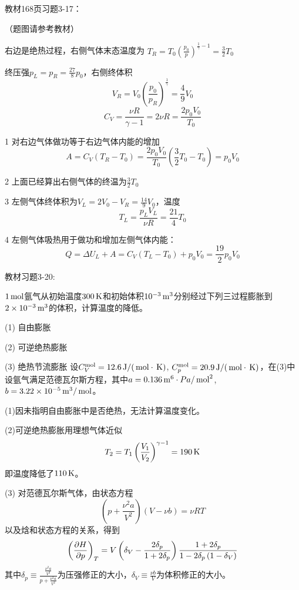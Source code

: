 \documentclass[CJK]{beamer}
\begin{document}
\begin{frame}
  \chtitle{\proid (\stwo)}
  \bch
  教材168页习题3-17：

  （题图请参考教材）
  \ech
\end{frame}

\begin{frame}
  \bch
  {\scriptsize
    右边是绝热过程，右侧气体末态温度为
    $T_R = T_0\left(\frac{p_0}{p}\right)^{\frac{1}{\gamma}-1} = \frac{3}{2}T_0$
    
    终压强$p_L=p_R=\frac{27}{8}p_0$，右侧终体积
    $$V_R = V_0\left(\frac{p_0}{p_R}\right)^{\frac{1}{\gamma}} = \frac{4}{9}V_0$$
    $$C_V = \frac{\nu R}{\gamma - 1} = 2 \nu R = \frac{2p_0V_0}{T_0}$$
  
    \bitem
  \item[1]{对右边气体做功等于右边气体内能的增加
    $$A = C_V(T_R-T_0) = \frac{2p_0V_0}{T_0}\left(\frac{3}{2}T_0-T_0\right) = p_0V_0$$}
  \item[2]{上面已经算出右侧气体的终温为$\frac{3}{2}T_0$}
  \item[3]{左侧气体终体积为$V_L=2V_0-V_R = \frac{14}{9}V_0$，温度
    $$T_L = \frac{p_LV_L}{\nu R} = \frac{21}{4}T_0$$}
  \item[4]{左侧气体吸热用于做功和增加左侧气体内能：
    $$ Q = \Delta U_L + A = C_V(T_L-T_0) + p_0V_0 = \frac{19}{2}p_0V_0$$}
    \eitem
  }
  \ech
\end{frame}

\begin{frame}
  \chtitle{\proid (\sthree)}
  \bch
  教材习题3-20:

  $1\,\mathrm{mol}$氩气从初始温度$300\,\mathrm{K}$和初始体积$10^{-3}\,\mathrm{m}^3$分别经过下列三过程膨胀到$2\times 10^{-3}\,\mathrm{m}^3$的体积，计算温度的降低。
  \bitem
\item[(1)]{自由膨胀}
\item[(2)]{可逆绝热膨胀}
\item[(3)]{绝热节流膨胀}
  \eitem
  设$C_V^{\rm mol} = 12.6\,\mathrm{J}/(\,\mathrm{mol}\cdot\,\mathrm{K})$, $C_p^{\rm mol} = 20.9\,\mathrm{J}/(\,\mathrm{mol}\cdot\,\mathrm{K})$，在(3)中设氩气满足范德瓦尔斯方程，其中$a = 0.136\,\mathrm{m}^6\cdot Pa/\,\mathrm{mol}^2$, $b =3.22\times 10^{-5}\,\mathrm{m}^3/\,\mathrm{mol}$。
  \ech
\end{frame}


\begin{frame}
  \bch
  {\scriptsize
    (1)因未指明自由膨胀中是否绝热，无法计算温度变化。
    
  (2)可逆绝热膨胀用理想气体近似
  $$T_2 = T_1 \left(\frac{V_1}{V_2}\right)^{\gamma-1} = 190 \,\mathrm{K} $$
    即温度降低了$110\,\mathrm{K}$。
    
  (3) 对范德瓦尔斯气体，由状态方程
$$\left(p + \frac{\nu^2 a}{V^2}\right) \left(V - \nu b\right) = \nu RT$$
以及焓和状态方程的关系，得到
$$\left(\frac{\partial H}{\partial p}\right)_{T} = V \left(\delta_V - \frac{2\delta_p}{1+2\delta_p}\right) \frac{1+2\delta_p}{1-2\delta_p\left(1-\delta_V\right)}$$
其中$\delta_p \equiv \frac{\frac{\nu^2a}{V^2}}{p+\frac{\nu^2 a}{V^2}}$为压强修正的大小，$\delta_V\equiv \frac{\nu b}{V}$为体积修正的大小。
  }
  \ech
\end{frame}
\end{document}

